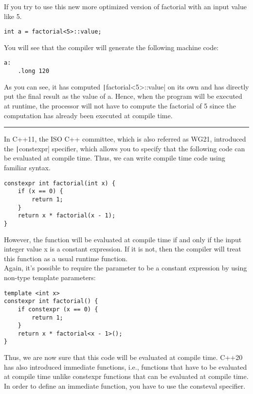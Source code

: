 If you try to use this new more optimized version of factorial with an input value like 5.
\begin{verbatim}
int a = factorial<5>::value;
\end{verbatim}

You will see that the compiler will generate the following machine code:
\begin{verbatim}
a:
    .long 120
\end{verbatim}

As you can see, it has computed \texttt|factorial<5>::value| on its own and has directly put the final result as the value of a. Hence, when the program will be executed at runtime, the processor will not have to compute the factorial of 5 since the computation has already been executed at compile time.

\vspace{10pt}
\hrule

\begin{paracol}{2}
\vspace{10pt}

In C++11, the ISO C++ committee, which is also referred as WG21, introduced the \texttt|constexpr| specifier, which allows you to specify that the following code can be evaluated at compile time. Thus, we can write compile time code using familiar syntax.

\switchcolumn

\begin{verbatim}
constexpr int factorial(int x) {
    if (x == 0) {
        return 1;
    }
    return x * factorial(x - 1);
}
\end{verbatim}
\end{paracol}

However, the function will be evaluated at compile time if and only if the input integer value x is a constant expression. If it is not, then the compiler will treat this function as a usual runtime function. \\

Again, it's possible to require the parameter to be a constant expression by using non-type template parameters:

\begin{verbatim}
template <int x>
constexpr int factorial() {
    if constexpr (x == 0) {
        return 1;
    }
    return x * factorial<x - 1>();
}
\end{verbatim}

Thus, we are now sure that this code will be evaluated at compile time. C++20 has also introduced immediate functions, i.e., functions that have to be evaluated at compile time unlike constexpr functions that can be evaluated at compile time. In order to define an immediate function, you have to use the consteval specifier.

